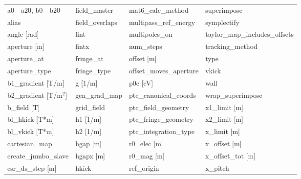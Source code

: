  \begin{tabular}{llll} \toprule
a0 - a20, b0 - b20               & field_master                     & mat6_calc_method                 & superimpose                      \\
alias                            & field_overlaps                   & multipass_ref_energy             & symplectify                      \\
angle [rad]                      & fint                             & multipoles_on                    & taylor_map_includes_offsets      \\
aperture [m]                     & fintx                            & num_steps                        & tracking_method                  \\
aperture_at                      & fringe_at                        & offset [m]                       & type                             \\
aperture_type                    & fringe_type                      & offset_moves_aperture            & vkick                            \\
b1_gradient [T/m]                & g [1/m]                          & p0c [eV]                         & wall                             \\
b2_gradient [T/m$^2$]            & gen_grad_map                     & ptc_canonical_coords             & wrap_superimpose                 \\
b_field [T]                      & grid_field                       & ptc_field_geometry               & x1_limit [m]                     \\
bl_hkick [T*m]                   & h1 [1/m]                         & ptc_fringe_geometry              & x2_limit [m]                     \\
bl_vkick [T*m]                   & h2 [1/m]                         & ptc_integration_type             & x_limit [m]                      \\
cartesian_map                    & hgap [m]                         & r0_elec [m]                      & x_offset [m]                     \\
create_jumbo_slave               & hgapx [m]                        & r0_mag [m]                       & x_offset_tot [m]                 \\
csr_ds_step [m]                  & hkick                            & ref_origin                       & x_pitch                          \\

\end{tabular}
